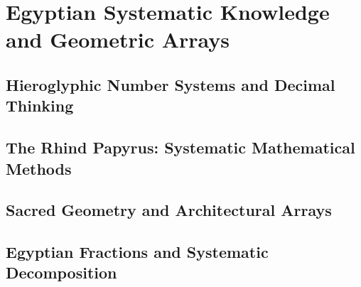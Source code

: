 

\chapter{Egyptian Systematic Knowledge and Geometric Arrays}

\section{Hieroglyphic Number Systems and Decimal Thinking}

\section{The Rhind Papyrus: Systematic Mathematical Methods}

\section{Sacred Geometry and Architectural Arrays}

\section{Egyptian Fractions and Systematic Decomposition}

